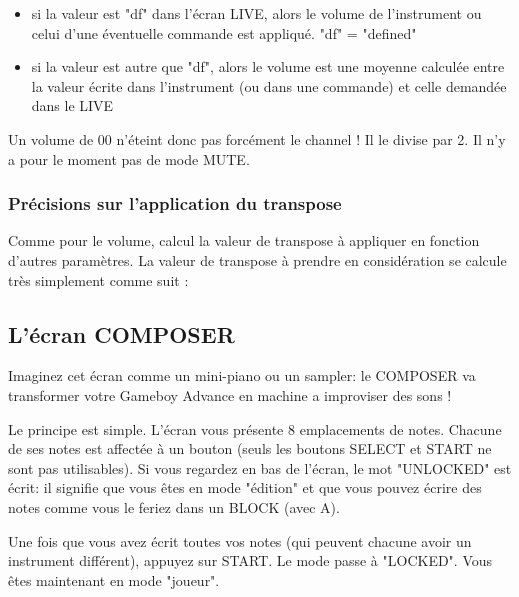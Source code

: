 \documentclass[12pt,a4paper]{article}
\begin{document}
    \begin{itemize}
        \item{si la valeur est "df" dans l'écran LIVE, alors le volume de l'instrument ou celui d'une éventuelle commande est appliqué. "df" = "defined"}
        \item{si la valeur est autre que "df", alors le volume est une moyenne calculée entre la valeur écrite dans l'instrument (ou dans une commande) et celle demandée dans le LIVE}
    \end{itemize}
    \medskip

    Un volume de 00 n'éteint donc pas forcément le channel ! Il le divise par 2.
    Il n'y a pour le moment pas de mode MUTE.


    \subsubsection{Précisions sur l'application du transpose}

    Comme pour le volume, \FAT calcul la valeur de transpose à appliquer en fonction d'autres paramètres.
    La valeur de transpose à prendre en considération se calcule très simplement comme suit :


    \subsection{L'écran COMPOSER}
    
    Imaginez cet écran comme un mini-piano ou un sampler: le COMPOSER va transformer votre Gameboy Advance en machine a improviser des sons !
    
    
    Le principe est simple.
    L'écran vous présente 8 emplacements de notes.
    Chacune de ses notes est affectée à un bouton (seuls les boutons SELECT et START ne sont pas utilisables).
    Si vous regardez en bas de l'écran, le mot "UNLOCKED" est écrit:
        il signifie que vous êtes en mode "édition" et que vous pouvez écrire des notes comme vous le feriez dans un BLOCK (avec A).
    \medskip
    
    Une fois que vous avez écrit toutes vos notes (qui peuvent chacune avoir un instrument différent), appuyez sur START.
    Le mode passe à "LOCKED". Vous êtes maintenant en mode "joueur".
    \medskip
    
\end{document}
